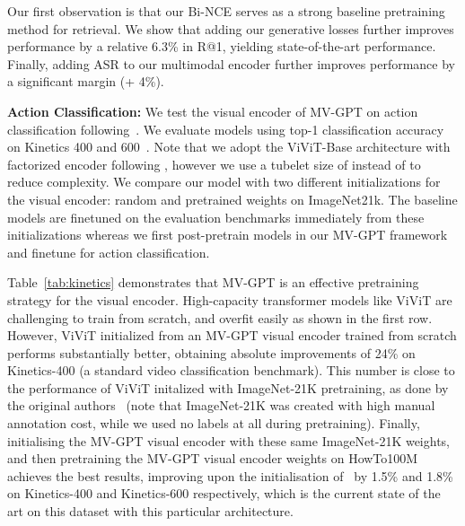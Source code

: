 \documentclass[10pt,twocolumn,letterpaper]{article}
\def\model{MV-GPT\xspace}
\begin{document}
Our first observation is that our Bi-NCE serves as a strong baseline pretraining method for retrieval. We show that adding our generative losses further improves performance by a relative 6.3\% in R@1, yielding state-of-the-art performance.
Finally, adding ASR to our multimodal encoder further improves performance by a significant margin (+ 4\%). 


\noindent\textbf{Action Classification:} 
We test the visual encoder of \model on action classification following~\cite{arnab2021vivit}.
We evaluate models using top-1 classification accuracy on Kinetics 400 and 600~\cite{kay2017kinetics}.
Note that we adopt the ViViT-Base architecture with factorized encoder following \cite{arnab2021vivit}, however we use a tubelet size of  instead of  to reduce complexity.
We compare our model with two different initializations for the visual encoder: random and pretrained weights on ImageNet21k.
The baseline models are finetuned on the evaluation benchmarks immediately from these initializations whereas we first post-pretrain models in our MV-GPT framework and finetune for action classification.


Table~\ref{tab:kinetics} demonstrates that MV-GPT is an effective pretraining strategy for the visual encoder.
High-capacity transformer models like ViViT are challenging to train from scratch, and overfit easily as shown in the first row.
However, ViViT initialized from an MV-GPT visual encoder trained from scratch performs substantially better, obtaining absolute improvements of 24\% on Kinetics-400 (a standard video classification benchmark).
This number is close to  the performance of ViViT initalized with ImageNet-21K pretraining, as done by the original authors~\cite{arnab2021vivit} (note that ImageNet-21K was created with high manual annotation cost, while we used no labels at all during pretraining).
Finally, initialising the MV-GPT visual encoder with these same ImageNet-21K weights, and then pretraining the MV-GPT visual encoder weights on HowTo100M achieves the best results, improving upon the initialisation of~\cite{arnab2021vivit} by 1.5\% and 1.8\% on Kinetics-400 and Kinetics-600 respectively, which is the current state of the art on this dataset with this particular architecture.
\end{document}

